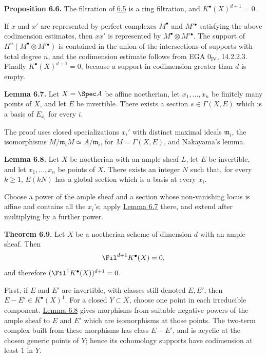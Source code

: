 \textbf{Proposition 6.6.} The filtration of \hyperlink{sga6.e06.sec.6.5}{6.5} is a ring filtration, and \(K^\bullet(X)^{d+1}=0\).

If \(x\) and \(x'\) are represented by perfect complexes \(M^\bullet\) and \(M'{}^\bullet\) satisfying the above codimension estimates, then \(xx'\) is represented by \(M^\bullet\otimes M'{}^\bullet\). The support of \(H^n(M^\bullet\otimes M'{}^\bullet)\) is contained in the union of the intersections of supports with total degree \(n\), and the codimension estimate follows from EGA \(0_{\mathrm{IV}}\), 14.2.2.3. Finally \(K^\bullet(X)^{d+1}=0\), because a support in codimension greater than \(d\) is empty.

\textbf{Lemma 6.7.} Let \(X=\Spec A\) be affine noetherian, let \(x_1,\ldots,x_n\) be finitely many points of \(X\), and let \(E\) be invertible. There exists a section \(s\in \Gamma(X,E)\) which is a basis of \(E_{x_i}\) for every \(i\).

The proof uses closed specializations \(x_i'\) with distinct maximal ideals \(\mathfrak m_i\), the isomorphisms \(M/\mathfrak m_iM\simeq A/\mathfrak m_i\), for \(M=\Gamma(X,E)\), and Nakayama's lemma.

\textbf{Lemma 6.8.} Let \(X\) be noetherian with an ample sheaf \(L\), let \(E\) be invertible, and let \(x_1,\ldots,x_n\) be points of \(X\). There exists an integer \(N\) such that, for every \(k\geq1\), \(E(kN)\) has a global section which is a basis at every \(x_i\).

Choose a power of the ample sheaf and a section whose non-vanishing locus is affine and contains all the \(x_i\)'s; apply \hyperlink{sga6.e06.lem.6-7}{Lemma 6.7} there, and extend after multiplying by a further power.

\textbf{Theorem 6.9.} Let \(X\) be a noetherian scheme of dimension \(d\) with an ample sheaf. Then
\[
  \Fil^{d+1}K^\bullet(X)=0,
\]
and therefore \((\Fil^1K^\bullet(X))^{d+1}=0\).

First, if \(E\) and \(E'\) are invertible, with classes still denoted \(E,E'\), then \(E-E'\in K^\bullet(X)^1\). For a closed \(Y\subset X\), choose one point in each irreducible component. \hyperlink{sga6.e06.lem.6-8}{Lemma 6.8} gives morphisms from suitable negative powers of the ample sheaf to \(E\) and \(E'\) which are isomorphisms at those points. The two-term complex built from these morphisms has class \(E-E'\), and is acyclic at the chosen generic points of \(Y\); hence its cohomology supports have codimension at least \(1\) in \(Y\).

